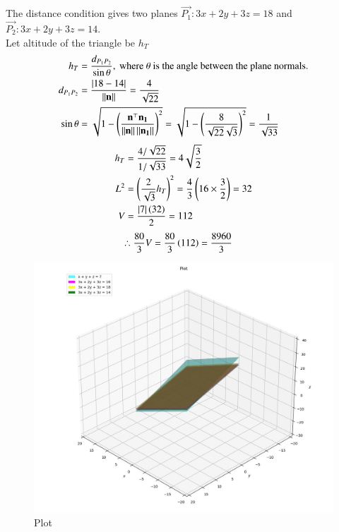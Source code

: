 \documentclass[journal]{IEEEtran}
\begin{document}
The distance condition gives two planes $\vec{P_1}: 3x+2y+3z=18$ and $\vec{P_2}: 3x+2y+3z=14$. \\
Let altitude of the triangle be $h_T$
\begin{align}
    h_T &= \frac{d_{P_1P_2}}{\sin\theta},\text{ where }\theta\text{ is the angle between the plane normals.} \\
    d_{P_1P_2} &= \frac{\left\vert18-14\right\vert}{\left\lVert\mathbf{n}\right\rVert} = \frac{4}{\sqrt{22}} \\
    \sin\theta &= \sqrt{1 - \left(\frac{\mathbf{n}^\top\mathbf{n_1}}{\left\lVert\mathbf{n}\right\rVert\left\lVert\mathbf{n_1}\right\rVert}\right)^2} = \sqrt{1 - \left(\frac{8}{\sqrt{22}\sqrt{3}}\right)^2} = \frac{1}{\sqrt{33}}
\end{align}
\begin{align}
    h_T &= \frac{4/\sqrt{22}}{1/\sqrt{33}} = 4\sqrt{\frac{3}{2}} \\
    L^2 &= \left(\frac{2}{\sqrt{3}}h_T\right)^2 = \frac{4}{3}\left(16 \times \frac{3}{2}\right) = 32 \\
    V &= \frac{\left\vert7\right\vert\left(32\right)}{2} = 112
\end{align}
\begin{align}
    \therefore \frac{80}{3}V &= \frac{80}{3}\left(112\right) = \frac{8960}{3}
\end{align}

\begin{figure}[h!]
	\centering
	\includegraphics[width=\columnwidth]{figs/plot_p.jpg}
	\caption*{Plot}
	\label{fig:fig}
\end{figure}
\end{document}

